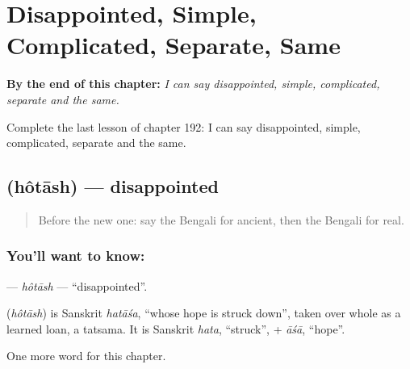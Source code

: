 
\chapter{Disappointed, Simple, Complicated, Separate, Same}
\label{ch:bn-disappointed-simple-complicated-separate-same}

\begin{chapteropening}
\textbf{By the end of this chapter:} \emph{I can say disappointed, simple, complicated, separate and the same.}

Complete the last lesson of chapter 192: I can say disappointed, simple, complicated, separate and the same.
\end{chapteropening}

\section[\texorpdfstring{\bn{হতাশ} (hôtāsh)}{হতাশ (hôtāsh)}]{ (hôtāsh) — disappointed}

\label{lesson:BN-C192-hotash}



\begin{quote}
Before the new one: say the Bengali for ancient, then the Bengali for real.
\end{quote}

\subsection*{You'll want to know: }
\textbf{} — \emph{hôtāsh} — \textquotedblleft{}disappointed\textquotedblright{}.

\begin{cousinweb}
\textbf{} (\emph{hôtāsh}) is Sanskrit \emph{hatāśa}, \textquotedblleft{}whose hope is struck down\textquotedblright{}, taken over whole as a learned loan, a tatsama. It is Sanskrit \emph{hata}, \textquotedblleft{}struck\textquotedblright{}, + \emph{āśā}, \textquotedblleft{}hope\textquotedblright{}.
\end{cousinweb}

\begin{grammarlens}[title={What you've built}]
One more word for this chapter.
\end{grammarlens}

